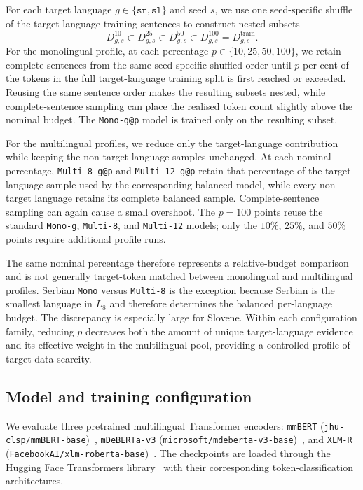 \documentclass{article}
\begin{document}
For each target language $g \in \{\texttt{sr}, \texttt{sl}\}$ and seed $s$, we use one seed-specific shuffle of the target-language training sentences to construct nested subsets
\[
D_{g,s}^{10} \subset D_{g,s}^{25} \subset D_{g,s}^{50} \subset D_{g,s}^{100} = D_{g,s}^{\mathrm{train}}.
\]
For the monolingual profile, at each percentage $p \in \{10,25,50,100\}$, we retain complete sentences from the same seed-specific shuffled order until $p$ per cent of the tokens in the full target-language training split is first reached or exceeded.
Reusing the same sentence order makes the resulting subsets nested, while complete-sentence sampling can place the realised token count slightly above the nominal budget.
The \texttt{Mono-g@p} model is trained only on the resulting subset.

For the multilingual profiles, we reduce only the target-language contribution while keeping the non-target-language samples unchanged.
At each nominal percentage, \texttt{Multi-8-g@p} and \texttt{Multi-12-g@p} retain that percentage of the target-language sample used by the corresponding balanced model, while every non-target language retains its complete balanced sample.
Complete-sentence sampling can again cause a small overshoot. The $p=100$ points reuse the standard \texttt{Mono-g}, \texttt{Multi-8}, and \texttt{Multi-12} models; only the $10\%$, $25\%$, and $50\%$ points require additional profile runs.

The same nominal percentage therefore represents a relative-budget comparison and is not generally target-token matched between monolingual and multilingual profiles.
Serbian \texttt{Mono} versus \texttt{Multi-8} is the exception because Serbian is the smallest language in $L_8$ and therefore determines the balanced per-language budget.
The discrepancy is especially large for Slovene.
Within each configuration family, reducing $p$ decreases both the amount of unique target-language evidence and its effective weight in the multilingual pool, providing a controlled profile of target-data scarcity.

\subsection{Model and training configuration}
We evaluate three pretrained multilingual Transformer encoders: \texttt{mmBERT} (\texttt{jhu-clsp/mmBERT-base})~\parencite{marone2025mmbertmodernmultilingualencoder}, \texttt{mDeBERTa-v3} (\texttt{microsoft/mdeberta-v3-base})~\parencite{he2021debertav3}, and \texttt{XLM-R} (\texttt{FacebookAI/xlm-roberta-base})~\parencite{conneau2019xlmr}.
The checkpoints are loaded through the Hugging Face Transformers library~\parencite{wolf-etal-2020-transformers} with their corresponding token-classification architectures.
\end{document}
